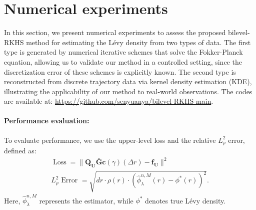 \documentclass[12pt]{article}
\numberwithin{equation}{section}
\numberwithin{theorem}{section}
\begin{document}
\section{Numerical experiments}
\label{sec4}
In this section, we present numerical experiments to assess the proposed bilevel-RKHS method for estimating the L\'evy density from two types of data. The first type is generated by numerical iterative schemes that solve the Fokker-Planck equation, allowing us to validate our method in a controlled setting, since the discretization error of these schemes is explicitly known. The second type is reconstructed from discrete trajectory data via kernel density estimation (KDE), illustrating the applicability of our method to real-world observations. The codes are available at: \href{https://github.com/senyuanya/bilevel-RKHS-main}{https://github.com/senyuanya/bilevel-RKHS-main}.


\paragraph{Performance evaluation:} To evaluate performance, we use the upper-level loss and the relative $L^2_\rho$ error, defined as:
\begin{equation}
\label{eq: LossError}
\begin{gathered}
\operatorname{Loss}=\| \mathbf{Q_U}\bar{\mathbf{G}}\mathbf{c} (\gamma) (\Delta r) - \mathbf{f_U}\|^2 \\
L^2_\rho\text { Error }=\sqrt{d r \cdot \rho(r) \cdot\left(\hat{\phi}^{n,M}_{\lambda}(r)-\phi^*(r)\right)^2}.
\end{gathered}
\end{equation}
Here, $\hat{\phi}^{n,M}_{\lambda} $ represents the estimator, while $\phi^*$ denotes true L\'evy density. 
\end{document}
